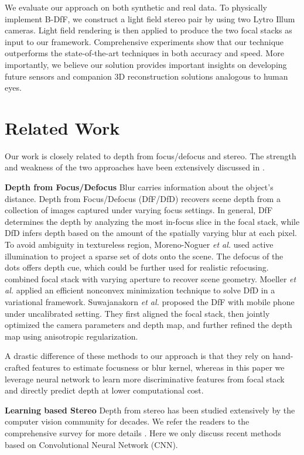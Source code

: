 \documentclass[10pt,twocolumn,letterpaper]{article}
\begin{document}
We evaluate our approach on both synthetic and real data. To physically implement B-DfF, we construct a light field stereo pair by using two Lytro Illum cameras. Light field rendering is then applied to produce the two focal stacks as input to our framework. Comprehensive experiments show that our technique outperforms the state-of-the-art techniques in both accuracy and speed. More importantly, we believe our solution provides important insights on developing future sensors and companion 3D reconstruction solutions analogous to human eyes.


\section{Related Work}
Our work is closely related to depth from focus/defocus and stereo. The strength and weakness of the two approaches have been extensively discussed in \cite{schechner00, vaish06}.

\noindent\textbf{Depth from Focus/Defocus}
Blur carries information about the object's distance. Depth from Focus/Defocus (DfF/DfD) recovers scene depth from a collection of images captured under varying focus settings. In general, DfF \cite{nayar92, nayar94, malik07} determines the depth by analyzing the most in-focus slice in the focal stack, while DfD \cite{favaro05, favaro07} infers depth based on the amount of the spatially varying blur at each pixel. To avoid ambiguity in textureless region, Moreno-Noguer \emph{et al.} \cite{Moreno-Noguer07} used active illumination to project a sparse set of dots onto the scene. The defocus of the dots offers depth cue, which could be further used for realistic refocusing. \cite{hasinoff09} combined focal stack with varying aperture to recover scene geometry. Moeller \emph{et al.} \cite{moeller15} applied an efficient nonconvex minimization technique to solve DfD in a variational framework. Suwajanakorn \emph{et al.} \cite{suwajanakorn15} proposed the DfF with mobile phone under uncalibrated setting. They first aligned the focal stack, then jointly optimized the camera parameters and depth map, and further refined the depth map using anisotropic regularization.

A drastic difference of these methods to our approach is that they rely on hand-crafted features to estimate focusness or blur kernel, whereas in this paper we leverage neural network to learn more discriminative features from focal stack and directly predict depth at lower computational cost.

\noindent \textbf{Learning based Stereo}
Depth from stereo has been studied extensively by the computer vision community for decades. We refer the readers to the comprehensive survey for more details \cite{scharstein02, brown03}. Here we only discuss recent methods based on Convolutional Neural Network (CNN).
\end{document}
